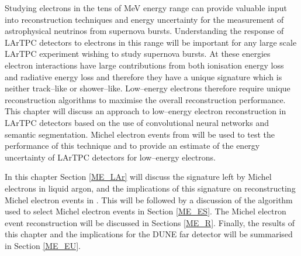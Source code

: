 Studying electrons in the tens of MeV energy range can provide valuable input 
into reconstruction techniques and energy uncertainty for the measurement of
astrophysical neutrinos from supernova bursts. Understanding the response of
LArTPC detectors to electrons in this range will be important for any large
scale LArTPC experiment wishing to study supernova bursts. At these energies
electron interactions have large contributions from both ionisation energy loss
and radiative energy loss and therefore they have a unique signature which is 
neither track--like or shower--like. Low--energy electrons therefore require 
unique reconstruction algorithms to maximise the overall reconstruction 
performance. This chapter will discuss an approach to low--energy electron
reconstruction in LArTPC detectors based on the use of convolutional neural
networks and semantic segmentation. Michel electron events from \protodune{} 
will be used to test the performance of this technique and to provide an 
estimate of the energy uncertainty of LArTPC detectors for low--energy 
electrons.

In this chapter Section \ref{ME_LAr} will discuss the signature left by Michel
electrons in liquid argon, and the implications of this signature on
reconstructing Michel electron events in \protodune{}. This will be followed by
a discussion of the algorithm used to select Michel electron events in Section
\ref{ME_ES}. The Michel electron event reconstruction will be discussed in
Sections \ref{ME_R}. Finally, the results of this chapter and the implications
for the DUNE far detector will be summarised in Section \ref{ME_EU}.

